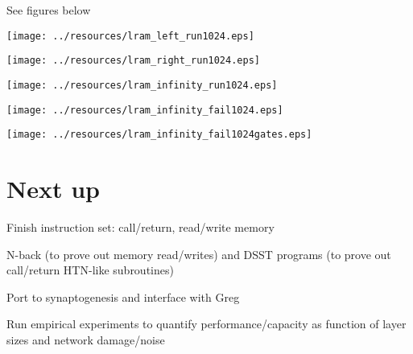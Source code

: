 \documentclass[pdftex,12pt,letterpaper]{article}
\begin{document}
See figures below

\begin{sidewaysfigure}
\centering
\texttt{[image: ../resources/lram\_left\_run1024.eps]}
\caption{A raster plot showing execution of the program in Table \ref{tbl:aas} when \texttt{TC} contains \texttt{left}.  The x-axis shows time-steps annotated with the currently executing instruction.  The y-axis shows different NVM layers.  Each row of the image shows one neural unit in one layer over time, where brightness indicates firing rate.}
\end{sidewaysfigure}

\begin{sidewaysfigure}
\centering
\texttt{[image: ../resources/lram\_right\_run1024.eps]}
\caption{A raster plot showing execution of the program in Table \ref{tbl:aas} when \texttt{TC} contains \texttt{right}.}
\end{sidewaysfigure}

\begin{sidewaysfigure}
\centering
\texttt{[image: ../resources/lram\_infinity\_run1024.eps]}
\caption{A raster plot showing execution of the program in Table \ref{tbl:aas} when \texttt{TC} contains \texttt{null}.}
\end{sidewaysfigure}

\begin{sidewaysfigure}
\centering
\texttt{[image: ../resources/lram\_infinity\_fail1024.eps]}
\caption{A raster plot showing failed execution of the program in Table \ref{tbl:aas} when \texttt{TC} contains \texttt{null}.  After a couple loop iterations the activity destabilizes.}
\label{fig:fail}
\end{sidewaysfigure}

\begin{sidewaysfigure}
\centering
\texttt{[image: ../resources/lram\_infinity\_fail1024gates.eps]}
\caption{A close-up of the destabilized memory and gate activity from Fig.\@ \ref{fig:fail}.}
\end{sidewaysfigure}


\section{Next up}

\indent * Finish instruction set: call/return, read/write memory

\noindent * N-back (to prove out memory read/writes) and DSST programs (to prove out call/return HTN-like subroutines)

\noindent * Port to synaptogenesis and interface with Greg

\noindent * Run empirical experiments to quantify performance/capacity as function of layer sizes and network damage/noise
\end{document}
